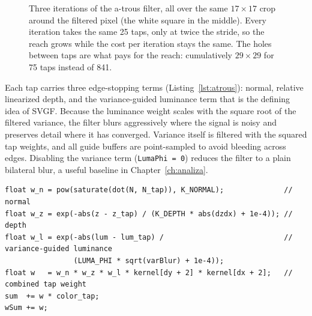 \begin{figure}[tbp]
\centering
{}
\caption[\`A-trous: growing stride and filter reach]{Three iterations of the a-trous filter, all over
the same $17\times17$ crop around the filtered pixel (the white square in the middle). Every
iteration takes the same 25 taps, only at twice the stride, so the reach grows while the cost per
iteration stays the same. The holes between taps are what pays for the reach: cumulatively
$29\times29$ for 75 taps instead of 841.}
\label{fig:atrous}
\end{figure}

Each tap carries three edge-stopping terms (Listing~\ref{lst:atrous}): normal, relative linearized
depth, and the variance-guided luminance term that is the defining idea of SVGF. Because the
luminance weight scales with the square root of the filtered variance, the filter blurs aggressively
where the signal is noisy and preserves detail where it has converged. Variance itself is filtered
with the squared tap weights, and all guide buffers are point-sampled to avoid bleeding across edges.
Disabling the variance term (\texttt{LumaPhi = 0}) reduces the filter to a plain bilateral blur, a
useful baseline in Chapter~\ref{ch:analiza}.


\begin{lstlisting}[caption={Edge-stopping weights for the \`a-trous filter (the SVGF kernel, HLSL).}, label={lst:atrous}]
float w_n = pow(saturate(dot(N, N_tap)), K_NORMAL);              // normal
float w_z = exp(-abs(z - z_tap) / (K_DEPTH * abs(dzdx) + 1e-4)); // depth
float w_l = exp(-abs(lum - lum_tap) /                            // variance-guided luminance
                (LUMA_PHI * sqrt(varBlur) + 1e-4));
float w   = w_n * w_z * w_l * kernel[dy + 2] * kernel[dx + 2];   // combined tap weight
sum  += w * color_tap;
wSum += w;
\end{lstlisting}

